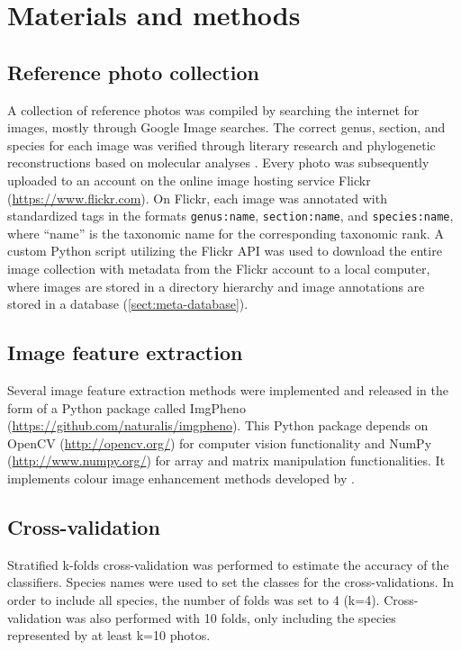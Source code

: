 \documentclass[review,3p,twocolumn]{elsarticle}
\begin{document}
\lipsum[1-3]

\section{Materials and methods}
\label{sect:methods}

\subsection{Reference photo collection}

A collection of reference photos was compiled by searching the internet for images, mostly through Google Image searches. The correct genus, section, and species for each image was verified through literary research \citep{Cribb1998, Pridgeon1999, Frosch2012} and phylogenetic reconstructions based on molecular analyses \citep{Li2011, Chochai2012}. Every photo was subsequently uploaded to an account on the online image hosting service Flickr (\url{https://www.flickr.com}). On Flickr, each image was annotated with standardized tags in the formats \texttt{genus:name}, \texttt{section:name}, and \texttt{species:name}, where ``name'' is the taxonomic name for the corresponding taxonomic rank. A custom Python script utilizing the Flickr API was used to download the entire image collection with metadata from the Flickr account to a local computer, where images are stored in a directory hierarchy and image annotations are stored in a database (\ref{sect:meta-database}).

\subsection{Image feature extraction}

Several image feature extraction methods were implemented and released in the form of a Python package called ImgPheno (\url{https://github.com/naturalis/imgpheno}). This Python package depends on OpenCV (\url{http://opencv.org/}) for computer vision functionality and NumPy (\url{http://www.numpy.org/}) for array and matrix manipulation functionalities. It implements colour image enhancement methods developed by \citet{Naik2003}.

\subsection{Cross-validation}

Stratified k-folds cross-validation was performed to estimate the accuracy of the classifiers. Species names were used to set the classes for the cross-validations. In order to include all species, the number of folds was set to 4 (k=4). Cross-validation was also performed with 10 folds, only including the species represented by at least k=10 photos.
\end{document}
